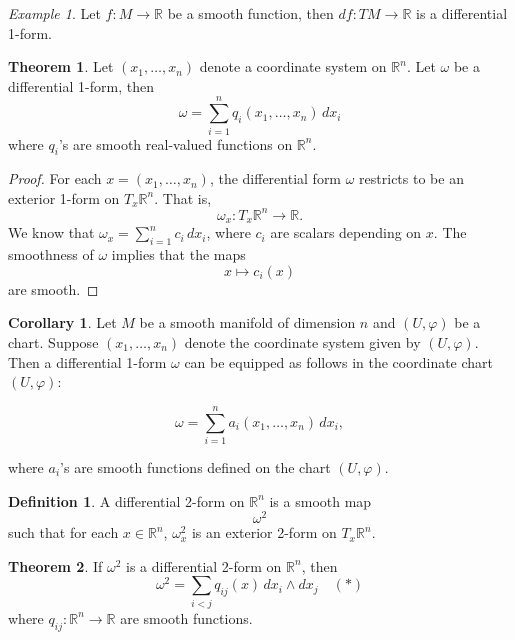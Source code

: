\documentclass[11pt]{article}
\theoremstyle{definition}
\newtheorem{definition}{Definition}[section]
\newtheorem{theorem}{Theorem}[section]
\newtheorem{corollary}{Corollary}[section]
\theoremstyle{remark}
\newtheorem{example}{Example}[section]
\begin{document}
\begin{example}\label{ex:derivative_as_1_form}
Let $f: M \to \mathbb{R}$ be a smooth function, then $df: TM \to \mathbb{R}$ is a differential 1-form.
\end{example}

\begin{theorem}\label{thm:differential_one_form}
Let $(x_1, \dots, x_n)$ denote a coordinate system on $\mathbb{R}^n$. Let $\omega$ be a differential 1-form, then
\[
\omega = \sum_{i=1}^n q_i(x_1, \dots, x_n) \, dx_i
\]
where $q_i$'s are smooth real-valued functions on $\mathbb{R}^n$.
\end{theorem}

\begin{proof}
For each $x = (x_1, \dots, x_n)$, the differential form $\omega$ restricts to be an exterior 1-form on $T_x \mathbb{R}^n$. That is,
\[
\omega_x \colon T_x \mathbb{R}^n \to \mathbb{R}.
\]
We know that $\omega_x = \sum_{i=1}^n c_i \, dx_i$, where $c_i$ are scalars depending on $x$. The smoothness of $\omega$ implies that the maps
\[
x \mapsto c_i(x)
\]
are smooth.
\end{proof}

\begin{corollary}\label{cor:differential_1form_coordinates}
Let $M$ be a smooth manifold of dimension $n$ and $(U,\varphi)$ be a chart. Suppose $(x_1,\ldots,x_n)$ denote the coordinate system given by $(U,\varphi)$. Then a differential 1-form $\omega$ can be equipped as follows in the coordinate chart $(U,\varphi)$:

\[
\omega = \sum_{i=1}^n a_i(x_1,\ldots,x_n)\,dx_i,
\]

where $a_i$'s are smooth functions defined on the chart $(U,\varphi)$.
\end{corollary}

\begin{definition}\label{def:differential_2_form}
A differential 2-form on $\mathbb{R}^n$ is a smooth map
\[
\omega^2
\]
such that for each $x \in \mathbb{R}^n$, $\omega^2_x$ is an exterior 2-form on $T_x \mathbb{R}^n$.
\end{definition}

\begin{theorem}\label{thm:differential_2_form_representation}
If $\omega^2$ is a differential 2-form on $\mathbb{R}^n$, then
\[
\omega^2 = \sum_{i < j} q_{ij}(x) \, dx_i \wedge dx_j \quad (\ast)
\]
where $q_{ij} : \mathbb{R}^n \to \mathbb{R}$ are smooth functions.
\end{theorem}
\end{document}
